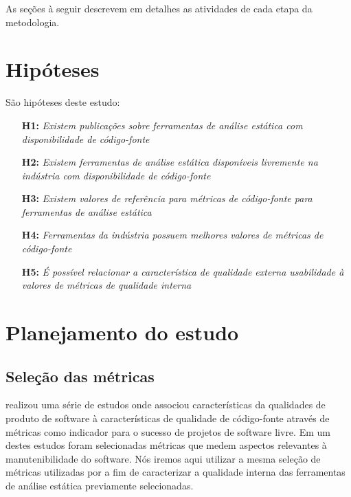 \documentclass[qual, classic, a4paper]{ufbathesis}
\begin{document}
As seções à seguir descrevem em detalhes as atividades de cada etapa da metodologia.

\section{Hipóteses}

São hipóteses deste estudo:

\begin{enumerate}
  \item[{\bf H1:}] {\em Existem publicações sobre ferramentas de análise
    estática com disponibilidade de código-fonte}
  \item[{\bf H2:}] {\em Existem ferramentas de análise estática disponíveis
    livremente na indústria com disponibilidade de código-fonte}
  \item[{\bf H3:}] {\em Existem valores de referência para métricas de
    código-fonte para ferramentas de análise estática}
  \item[{\bf H4:}] {\em Ferramentas da indústria possuem melhores valores de
    métricas de código-fonte}
  \item[{\bf H5:}] {\em É possível relacionar a característica de qualidade
    externa usabilidade à valores de métricas de qualidade interna}
\end{enumerate}

\section{Planejamento do estudo}

\subsection{Seleção das métricas}

 realizou uma série de estudos onde associou
características da qualidades de produto de software à características de
qualidade de código-fonte através de métricas como indicador para o sucesso de
projetos de software livre. Em um destes estudos foram selecionadas métricas
que medem aspectos relevantes à manutenibilidade do software. Nós iremos aqui
utilizar a mesma seleção de métricas utilizadas por 
a fim de caracterizar a qualidade interna das ferramentas de análise estática
previamente selecionadas.
\end{document}
